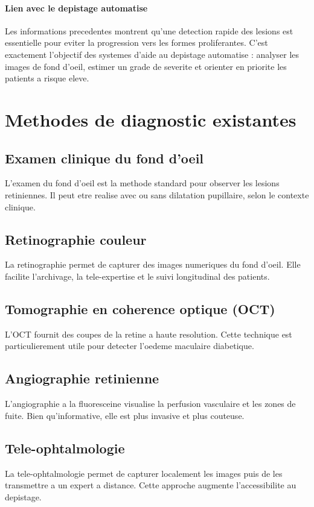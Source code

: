 \paragraph{Lien avec le depistage automatise}
Les informations precedentes montrent qu'une detection rapide des lesions est essentielle
pour eviter la progression vers les formes proliferantes. C'est exactement l'objectif
des systemes d'aide au depistage automatise : analyser les images de fond d'oeil,
estimer un grade de severite et orienter en priorite les patients a risque eleve.

\section{Methodes de diagnostic existantes}
\subsection{Examen clinique du fond d'oeil}
L'examen du fond d'oeil est la methode standard pour observer les lesions retiniennes.
Il peut etre realise avec ou sans dilatation pupillaire, selon le contexte clinique.

\subsection{Retinographie couleur}
La retinographie permet de capturer des images numeriques du fond d'oeil.
Elle facilite l'archivage, la tele-expertise et le suivi longitudinal des patients.

\subsection{Tomographie en coherence optique (OCT)}
L'OCT fournit des coupes de la retine a haute resolution.
Cette technique est particulierement utile pour detecter l'oedeme maculaire diabetique.

\subsection{Angiographie retinienne}
L'angiographie a la fluoresceine visualise la perfusion vasculaire et les zones de fuite.
Bien qu'informative, elle est plus invasive et plus couteuse.

\subsection{Tele-ophtalmologie}
La tele-ophtalmologie permet de capturer localement les images puis de les transmettre
a un expert a distance. Cette approche augmente l'accessibilite au depistage.

